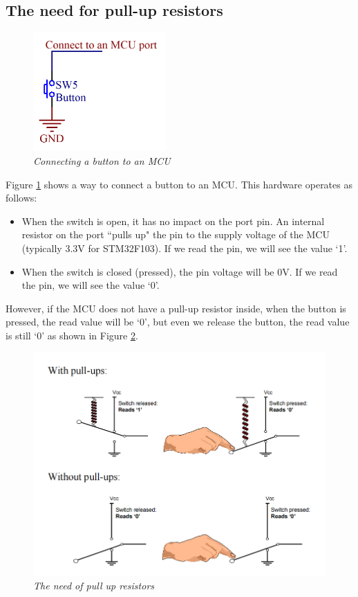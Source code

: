 \subsection{The need for pull-up resistors}
\begin{figure}[!htp]
    \centering
    \includegraphics[width=2in]{source/picture/bai_3/Button_Schematic_0.png}
    \caption{\textit{Connecting a button to an MCU}}
    \label{bai4_pic_button_schematic_0}
\end{figure}
Figure \ref{bai4_pic_button_schematic_0} shows a way to connect a button to an MCU. This hardware operates as follows:
\begin{itemize}
    \item When the switch is open, it has no impact on the port pin. An internal resistor on the port ``pulls up" the pin to the supply voltage of the MCU (typically 3.3V for STM32F103). If we read the pin, we will see the value `1'. 
    \item When the switch is closed (pressed), the pin voltage will be 0V. If we read the pin, we will see the value `0'. 
\end{itemize}
 
 However, if the MCU does not have a pull-up resistor inside, when the button is pressed, the read value will be `0', but even we release the button, the read value is still `0' as shown in Figure \ref{bai4_pic_the_need_of_pull_up_resistors}.
 \begin{figure}[!htp]
    \centering
    \includegraphics[width=4.5in]{source/picture/bai_3/pullup_resistors.png}
    \caption{\textit{The need of pull up resistors}}
    \label{bai4_pic_the_need_of_pull_up_resistors}
\end{figure}

